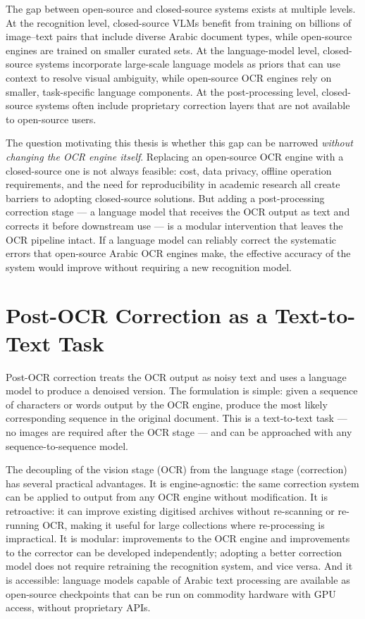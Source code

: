 The gap between open-source and closed-source systems exists at multiple
levels. At the recognition level, closed-source VLMs benefit from training
on billions of image--text pairs that include diverse Arabic document types,
while open-source engines are trained on smaller curated sets. At the
language-model level, closed-source systems incorporate large-scale language
models as priors that can use context to resolve visual ambiguity, while
open-source OCR engines rely on smaller, task-specific language components.
At the post-processing level, closed-source systems often include proprietary
correction layers that are not available to open-source users.

The question motivating this thesis is whether this gap can be narrowed
\emph{without changing the OCR engine itself}. Replacing an open-source
OCR engine with a closed-source one is not always feasible: cost, data
privacy, offline operation requirements, and the need for reproducibility
in academic research all create barriers to adopting closed-source solutions.
But adding a post-processing correction stage --- a language model that
receives the OCR output as text and corrects it before downstream use ---
is a modular intervention that leaves the OCR pipeline intact. If a language
model can reliably correct the systematic errors that open-source Arabic OCR
engines make, the effective accuracy of the system would improve without
requiring a new recognition model.

\section{Post-OCR Correction as a Text-to-Text Task}
\label{sec:intro_postorc}

Post-OCR correction treats the OCR output as noisy text and uses a language
model to produce a denoised version. The formulation is simple: given a
sequence of characters or words output by the OCR engine, produce the most
likely corresponding sequence in the original document. This is a
text-to-text task --- no images are required after the OCR stage --- and can
be approached with any sequence-to-sequence model.

The decoupling of the vision stage (OCR) from the language stage (correction)
has several practical advantages. It is engine-agnostic: the same correction
system can be applied to output from any OCR engine without modification.
It is retroactive: it can improve existing digitised archives without
re-scanning or re-running OCR, making it useful for large collections where
re-processing is impractical. It is modular: improvements to the OCR engine
and improvements to the corrector can be developed independently; adopting a
better correction model does not require retraining the recognition system,
and vice versa. And it is accessible: language models capable of Arabic text
processing are available as open-source checkpoints that can be run on
commodity hardware with GPU access, without proprietary APIs.

